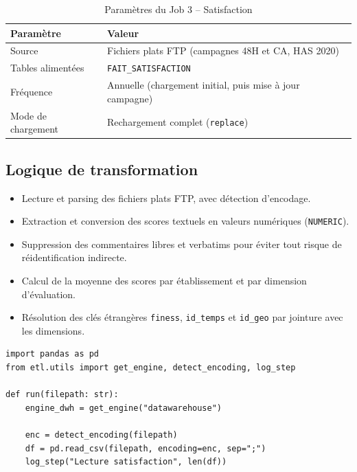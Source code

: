 \documentclass[12pt, a4paper]{report}
\begin{document}
\begin{itemize}[label=\textcolor{chuBlue}{\textbullet}]
\begin{table}[htbp]
\centering\footnotesize\renewcommand{\arraystretch}{1.4}
\begin{tabularx}{\linewidth}{@{} L{3.5cm} X @{}}
\toprule
{}
\textbf{Paramètre} & \textbf{Valeur} \\
\midrule
Source & Fichiers plats FTP (campagnes 48H et CA, HAS 2020) \\
Tables alimentées & \texttt{FAIT\_SATISFACTION} \\
Fréquence & Annuelle (chargement initial, puis mise à jour campagne) \\
Mode de chargement & Rechargement complet (\texttt{replace}) \\
\bottomrule
\end{tabularx}
\caption{Paramètres du Job 3 -- Satisfaction}
\label{tab:job3_params}
\end{table}

\subsection{Logique de transformation}

\begin{itemize}[label=\textcolor{chuBlue}{\textbullet}]
  \item Lecture et parsing des fichiers plats FTP, avec détection d'encodage.
  \item Extraction et conversion des scores textuels en valeurs numériques (\texttt{NUMERIC}).
  \item Suppression des commentaires libres et verbatims pour éviter tout risque de réidentification indirecte.
  \item Calcul de la moyenne des scores par établissement et par dimension d'évaluation.
  \item Résolution des clés étrangères \texttt{finess}, \texttt{id\_temps} et \texttt{id\_geo} par jointure avec les dimensions.
\end{itemize}

\begin{lstlisting}[style=python, caption={Job 3 -- traitement des fichiers de satisfaction}, label={lst:job3}]
import pandas as pd
from etl.utils import get_engine, detect_encoding, log_step

def run(filepath: str):
    engine_dwh = get_engine("datawarehouse")

    enc = detect_encoding(filepath)
    df = pd.read_csv(filepath, encoding=enc, sep=";")
    log_step("Lecture satisfaction", len(df))


\end{lstlisting}
\end{itemize}
\end{document}
